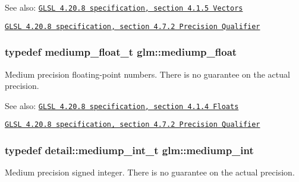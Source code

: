 \begin{Desc}
\item[See also:]\href{http://www.opengl.org/registry/doc/GLSLangSpec.4.20.8.pdf}{\tt GLSL 4.20.8 specification, section 4.1.5 Vectors} 

\href{http://www.opengl.org/registry/doc/GLSLangSpec.4.20.8.pdf}{\tt GLSL 4.20.8 specification, section 4.7.2 Precision Qualifier} \end{Desc}
\hypertarget{group__core__precision_gc785826c039fe6c97c03b37c81c1a68e}{
\subsubsection[mediump\_\-float]{\setlength{\rightskip}{0pt plus 5cm}typedef mediump\_\-float\_\-t {\bf glm::mediump\_\-float}}}
\label{group__core__precision_gc785826c039fe6c97c03b37c81c1a68e}


Medium precision floating-point numbers. There is no guarantee on the actual precision.

\begin{Desc}
\item[See also:]\href{http://www.opengl.org/registry/doc/GLSLangSpec.4.20.8.pdf}{\tt GLSL 4.20.8 specification, section 4.1.4 Floats} 

\href{http://www.opengl.org/registry/doc/GLSLangSpec.4.20.8.pdf}{\tt GLSL 4.20.8 specification, section 4.7.2 Precision Qualifier} \end{Desc}
\hypertarget{group__core__precision_g2a3dcbcd7f4e17663d393a12061ac6ac}{
\subsubsection[mediump\_\-int]{\setlength{\rightskip}{0pt plus 5cm}typedef detail::mediump\_\-int\_\-t {\bf glm::mediump\_\-int}}}
\label{group__core__precision_g2a3dcbcd7f4e17663d393a12061ac6ac}


Medium precision signed integer. There is no guarantee on the actual precision.

